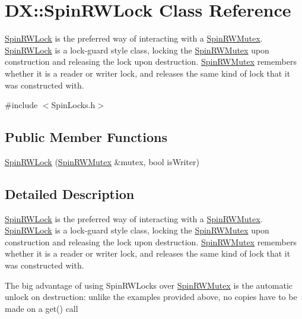 \hypertarget{class_d_x_1_1_spin_r_w_lock}{\section{D\-X\-:\-:Spin\-R\-W\-Lock Class Reference}
\label{class_d_x_1_1_spin_r_w_lock}
}


\hyperlink{class_d_x_1_1_spin_r_w_lock}{Spin\-R\-W\-Lock} is the preferred way of interacting with a \hyperlink{class_d_x_1_1_spin_r_w_mutex}{Spin\-R\-W\-Mutex}. \hyperlink{class_d_x_1_1_spin_r_w_lock}{Spin\-R\-W\-Lock} is a lock-\/guard style class, locking the \hyperlink{class_d_x_1_1_spin_r_w_mutex}{Spin\-R\-W\-Mutex} upon construction and releasing the lock upon destruction. \hyperlink{class_d_x_1_1_spin_r_w_mutex}{Spin\-R\-W\-Mutex} remembers whether it is a reader or writer lock, and releases the same kind of lock that it was constructed with.  




{\ttfamily \#include $<$Spin\-Locks.\-h$>$}

\subsection*{Public Member Functions}
\begin{DoxyCompactItemize}
\item 
\hyperlink{class_d_x_1_1_spin_r_w_lock_a69454faf90759dcb64cca55d827f838d}{Spin\-R\-W\-Lock} (\hyperlink{class_d_x_1_1_spin_r_w_mutex}{Spin\-R\-W\-Mutex} \&mutex, bool is\-Writer)
\end{DoxyCompactItemize}


\subsection{Detailed Description}
\hyperlink{class_d_x_1_1_spin_r_w_lock}{Spin\-R\-W\-Lock} is the preferred way of interacting with a \hyperlink{class_d_x_1_1_spin_r_w_mutex}{Spin\-R\-W\-Mutex}. \hyperlink{class_d_x_1_1_spin_r_w_lock}{Spin\-R\-W\-Lock} is a lock-\/guard style class, locking the \hyperlink{class_d_x_1_1_spin_r_w_mutex}{Spin\-R\-W\-Mutex} upon construction and releasing the lock upon destruction. \hyperlink{class_d_x_1_1_spin_r_w_mutex}{Spin\-R\-W\-Mutex} remembers whether it is a reader or writer lock, and releases the same kind of lock that it was constructed with. 

The big advantage of using Spin\-R\-W\-Locks over \hyperlink{class_d_x_1_1_spin_r_w_mutex}{Spin\-R\-W\-Mutex} is the automatic unlock on destruction\-: unlike the examples provided above, no copies have to be made on a get() call

